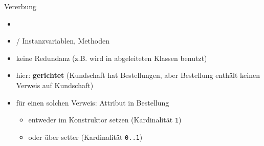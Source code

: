 \begin{frame}[fragile]{Vererbung}
    \begin{solve}[a)]
        \begin{itemize}
            \item {}
            \item {}/ Instanzvariablen,  Methoden
            \item keine Redundanz (z.B.  wird in abgeleiteten Klassen benutzt)
        \end{itemize}
    \end{solve}%
    \addtocounter{solve}{-1}
    \begin{solve}[b)]
        \begin{itemize}
            \item hier: \textbf{gerichtet} (Kundschaft hat Bestellungen, aber Bestellung enthält keinen Verweis auf Kundschaft)
            \item für einen solchen Verweis: Attribut in Bestellung \begin{itemize}
                \item entweder im Konstruktor setzen (Kardinalität \texttt{1})
                \item oder über setter (Kardinalität \texttt{0..1})
            \end{itemize}
        \end{itemize}
    \end{solve}
\end{frame}